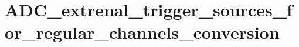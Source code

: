 \hypertarget{group___a_d_c__extrenal__trigger__sources__for__regular__channels__conversion}{\section{A\-D\-C\-\_\-extrenal\-\_\-trigger\-\_\-sources\-\_\-for\-\_\-regular\-\_\-channels\-\_\-conversion}
\label{group___a_d_c__extrenal__trigger__sources__for__regular__channels__conversion}
}
